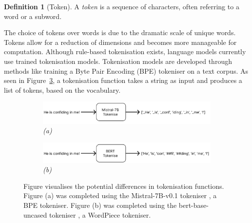 \documentclass{l4proj}
\theoremstyle{definition}
\newtheorem{definition}{Definition}[section]
\newcommand{\codefont}[1]{{\fontfamily{lmtt}\selectfont #1}}
\begin{document}
        \begin{definition}[Token]
            A \emph{token} is a sequence of characters, often referring to a word or a subword.
        \end{definition}

        The choice of tokens over words is due to the dramatic scale of unique words. Tokens allow for a reduction of dimensions and becomes more manageable for computation. Although rule-based tokenisation exists, language models currently use trained tokenisation models. Tokenisation models are developed through methods like training a Byte Pair Encoding (BPE) tokeniser \citep{Gage1994ANA, sennrich2016neural} on a text corpus. As seen in Figure~\ref{fig:tokenisation-process}, a tokenisation function takes a string as input and produces a list of tokens, based on the vocabulary. 
        
        \begin{figure}[ht]
            \captionsetup[subfigure]{labelformat=empty}
            \centering
            \begin{subfigure}{\textwidth}
                \includegraphics[width=\linewidth]{images/background/tokenisation-process-mistral.png}
                \caption{\emph{(a)}}
                \label{fig:tokenisation-process-mistral}
            \end{subfigure}

            \begin{subfigure}{\textwidth}
                \includegraphics[width=\linewidth]{images/background/tokenisation-process-bert.png}
                \caption{\emph{(b)}}
                \label{fig:tokenisation-process-bert}
            \end{subfigure}

            \caption{Figure visualises the potential differences in tokenisation functions. Figure (a) was completed using the \codefont{Mistral-7B-v0.1} tokeniser \citep{jiang2023mistral}, a BPE tokeniser. Figure (b) was completed using the \codefont{bert-base-uncased} tokeniser \citep{DBLP:journals/corr/abs-1810-04805}, a WordPiece tokeniser.}
            \label{fig:tokenisation-process}
        \end{figure}
\end{document}
